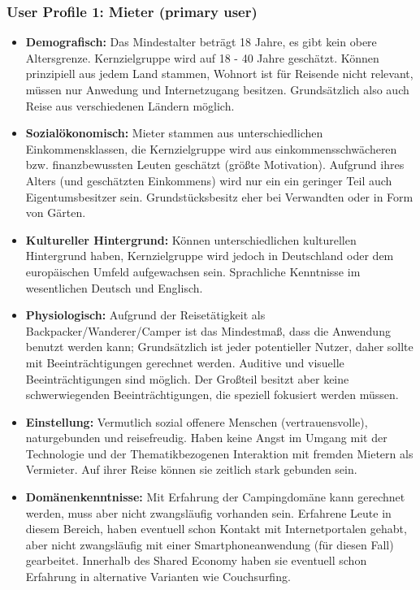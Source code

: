 \subsubsection{User Profile 1: Mieter (primary user)}
\begin{itemize}
   \item 
   \textbf{Demografisch:} Das Mindestalter beträgt 18 Jahre, es gibt kein obere Altersgrenze. Kernzielgruppe wird auf 18 - 40 Jahre geschätzt. Können prinzipiell aus jedem Land stammen, Wohnort ist für Reisende nicht relevant, müssen nur Anwedung und Internetzugang besitzen. Grundsätzlich also auch Reise aus verschiedenen Ländern möglich.

   \item 
  \textbf{Sozialökonomisch:} Mieter stammen aus unterschiedlichen Einkommensklassen, die Kernzielgruppe wird aus einkommensschwächeren bzw. finanzbewussten Leuten geschätzt (größte Motivation). 
   Aufgrund ihres Alters (und geschätzten Einkommens) wird nur ein ein geringer Teil auch Eigentumsbesitzer sein. Grundstücksbesitz eher bei Verwandten oder in Form von Gärten.

   \item 
   \textbf{Kultureller Hintergrund:} Können unterschiedlichen kulturellen Hintergrund haben, Kernzielgruppe wird jedoch in Deutschland oder dem europäischen Umfeld aufgewachsen sein. Sprachliche Kenntnisse im wesentlichen Deutsch und Englisch.

   \item
  \textbf{Physiologisch:} Aufgrund der Reisetätigkeit als Backpacker/Wanderer/Camper ist das Mindestmaß, dass die Anwendung benutzt werden kann; Grundsätzlich ist jeder potentieller Nutzer, daher sollte mit Beeinträchtigungen gerechnet werden. Auditive und visuelle Beeinträchtigungen sind möglich. Der Großteil besitzt aber keine schwerwiegenden Beeinträchtigungen, die speziell fokusiert werden müssen.

   \item 
   \textbf{Einstellung:} Vermutlich sozial offenere Menschen (vertrauensvolle), naturgebunden und reisefreudig. Haben keine Angst im Umgang mit der Technologie und der Thematikbezogenen Interaktion mit fremden Mietern als Vermieter. Auf ihrer Reise können sie zeitlich stark gebunden sein.

   \item 
  \textbf{Domänenkenntnisse:} Mit Erfahrung der Campingdomäne kann gerechnet werden, muss aber nicht zwangsläufig vorhanden sein.
   Erfahrene Leute in diesem Bereich, haben eventuell schon Kontakt mit Internetportalen gehabt, aber nicht zwangsläufig mit einer Smartphoneanwendung (für diesen Fall) gearbeitet.
   Innerhalb des Shared Economy haben sie eventuell schon Erfahrung in alternative Varianten wie Couchsurfing.


\end{itemize}

